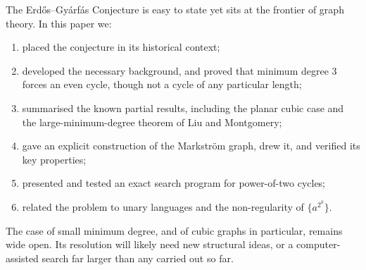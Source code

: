 \documentclass[11pt,a4paper]{article}
\theoremstyle{definition}
\begin{document}
The Erd\H{o}s--Gy\'arf\'as Conjecture is easy to state yet sits at the
frontier of graph theory. In this paper we:
\begin{enumerate}
  \item placed the conjecture in its historical context;
  \item developed the necessary background, and proved that minimum degree $3$
        forces an even cycle, though not a cycle of any particular length;
  \item summarised the known partial results, including the planar cubic case
        and the large-minimum-degree theorem of Liu and Montgomery;
  \item gave an explicit construction of the Markstr\"om graph, drew it, and
        verified its key properties;
  \item presented and tested an exact search program for power-of-two cycles;
  \item related the problem to unary languages and the non-regularity of
        $\{a^{2^k}\}$.
\end{enumerate}
The case of small minimum degree, and of cubic graphs in particular, remains
wide open. Its resolution will likely need new structural ideas, or a
computer-assisted search far larger than any carried out so far.
\end{document}
